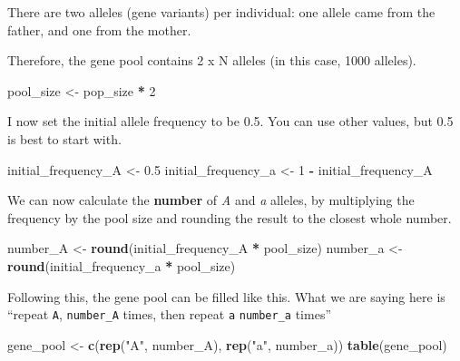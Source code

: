 \documentclass[
  a4paper]{book}
\newenvironment{Shaded}{\begin{snugshade}}{\end{snugshade}}
\newcommand{\DecValTok}[1]{\textcolor[rgb]{0.00,0.00,0.81}{#1}}
\newcommand{\FloatTok}[1]{\textcolor[rgb]{0.00,0.00,0.81}{#1}}
\newcommand{\FunctionTok}[1]{\textcolor[rgb]{0.13,0.29,0.53}{\textbf{#1}}}
\newcommand{\NormalTok}[1]{#1}
\newcommand{\OtherTok}[1]{\textcolor[rgb]{0.56,0.35,0.01}{#1}}
\newcommand{\SpecialCharTok}[1]{\textcolor[rgb]{0.81,0.36,0.00}{\textbf{#1}}}
\newcommand{\StringTok}[1]{\textcolor[rgb]{0.31,0.60,0.02}{#1}}
\begin{document}
There are two alleles (gene variants) per individual: one allele came from the father, and one from the mother.

Therefore, the gene pool contains 2 x N alleles (in this case, 1000 alleles).

\begin{Shaded}
\begin{Highlighting}[]
\NormalTok{pool\_size }\OtherTok{\textless{}{-}}\NormalTok{ pop\_size }\SpecialCharTok{*} \DecValTok{2}
\end{Highlighting}
\end{Shaded}

I now set the initial allele frequency to be 0.5. You can use other values, but 0.5 is best to start with.

\begin{Shaded}
\begin{Highlighting}[]
\NormalTok{initial\_frequency\_A }\OtherTok{\textless{}{-}} \FloatTok{0.5}
\NormalTok{initial\_frequency\_a }\OtherTok{\textless{}{-}} \DecValTok{1} \SpecialCharTok{{-}}\NormalTok{ initial\_frequency\_A}
\end{Highlighting}
\end{Shaded}

We can now calculate the \textbf{number} of \emph{A} and \emph{a} alleles, by multiplying the frequency by the pool size and rounding the result to the closest whole number.

\begin{Shaded}
\begin{Highlighting}[]
\NormalTok{number\_A }\OtherTok{\textless{}{-}} \FunctionTok{round}\NormalTok{(initial\_frequency\_A }\SpecialCharTok{*}\NormalTok{ pool\_size)}
\NormalTok{number\_a }\OtherTok{\textless{}{-}} \FunctionTok{round}\NormalTok{(initial\_frequency\_a }\SpecialCharTok{*}\NormalTok{ pool\_size)}
\end{Highlighting}
\end{Shaded}

Following this, the gene pool can be filled like this.
What we are saying here is ``repeat \texttt{A}, \texttt{number\_A} times, then repeat \texttt{a} \texttt{number\_a} times''

\begin{Shaded}
\begin{Highlighting}[]
\NormalTok{gene\_pool }\OtherTok{\textless{}{-}} \FunctionTok{c}\NormalTok{(}\FunctionTok{rep}\NormalTok{(}\StringTok{"A"}\NormalTok{, number\_A), }\FunctionTok{rep}\NormalTok{(}\StringTok{"a"}\NormalTok{, number\_a))}
\FunctionTok{table}\NormalTok{(gene\_pool)}
\end{Highlighting}
\end{Shaded}
\end{document}

